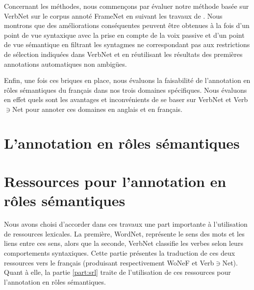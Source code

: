 \documentclass[oneside,parskip]{scrbook}
\newcommand{\verbenet}{Verb$\ni$Net}
\begin{document}
Concernant les méthodes, nous commençons par évaluer notre méthode basée sur
VerbNet sur le corpus annoté FrameNet en suivant les travaux de
\cite{swier2005exploiting}.  Nous montrons que des améliorations conséquentes
peuvent être obtenues à la fois d'un point de vue syntaxique avec la prise en
compte de la voix passive et d'un point de vue sémantique en filtrant les
syntagmes ne correspondant pas aux restrictions de sélection indiquées dans
VerbNet et en réutilisant les résultats des premières annotations automatiques
non ambigües.

Enfin, une fois ces briques en place, nous évaluons la faisabilité de
l'annotation en rôles sémantiques du français dans nos trois domaines
spécifiques. Nous évaluons en effet quels sont les avantages et inconvénients
de se baser sur VerbNet et \verbenet{} pour annoter ces domaines en anglais et
en français.


\setcounter{tocdepth}{3}
\tableofcontents

\mainmatter

\part{L'annotation en rôles sémantiques}





\part{Ressources pour l'annotation en rôles sémantiques}
\label{part:translation}


Nous avons choisi d'accorder dans ces travaux une part importante à
l'utilisation de ressources lexicales. La première, WordNet, représente le sens
des mots et les liens entre ces sens, alors que la seconde, VerbNet classifie
les verbes selon leurs comportements syntaxiques. Cette partie présentes la
traduction de ces deux ressources vers le français (produisant respectivement
WoNeF et \verbenet{}). Quant à elle, la partie \ref{part:srl} traite de
l'utilisation de ces ressources pour l'annotation en rôles sémantiques.


\end{document}
